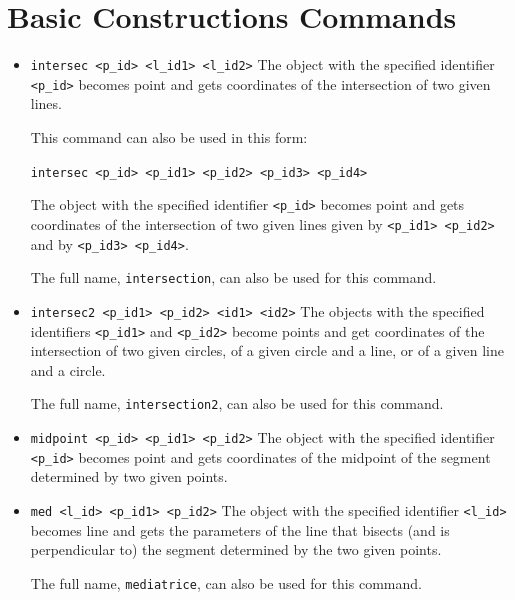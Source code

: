 \documentclass[a4paper]{book}
\begin{document}
\section{Basic Constructions Commands}

\begin{itemize}
\item \verb|intersec <p_id> <l_id1> <l_id2>|
        The object with the specified identifier \verb|<p_id>| becomes {\sc point}
        and gets coordinates of the intersection of two given lines.

        This command can also be used in this form:

        \verb|intersec <p_id> <p_id1> <p_id2> <p_id3> <p_id4>|

        The object with the specified identifier \verb|<p_id>| becomes {\sc point}
        and gets coordinates of the intersection of two given lines given by
        \verb|<p_id1> <p_id2>| and by \verb|<p_id3> <p_id4>|.

        The full name, \verb|intersection|, can also be used for this command.

\item \verb|intersec2 <p_id1> <p_id2> <id1> <id2>|
        The objects with the specified identifiers \verb|<p_id1>| and \verb|<p_id2>|
        become {\sc point}s and get coordinates of the intersection of
        two given circles, of a given circle and a line, or of a
        given line and a circle.

        The full name, \verb|intersection2|, can also be used for this command.

\item \verb|midpoint <p_id> <p_id1> <p_id2>|
        The object with the specified identifier \verb|<p_id>| becomes {\sc point}
        and gets coordinates of the midpoint of the segment determined by
        two given points.

\item \verb|med <l_id> <p_id1> <p_id2>|
        The object with the specified identifier \verb|<l_id>| becomes
        {\sc line} and gets the parameters of the line that bisects (and
        is perpendicular to) the segment determined by the two given points.

        The full name, \verb|mediatrice|, can also be used for this command.


\end{itemize}
\end{document}
